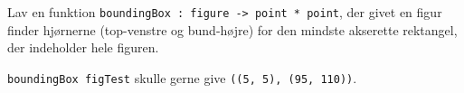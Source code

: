 Lav en funktion \texttt{boundingBox : figure -> point *
    point}, der givet en figur finder hjørnerne (top-venstre og
  bund-højre) for den mindste akserette rektangel, der indeholder hele
  figuren.
  
  \texttt{boundingBox figTest} skulle gerne give \texttt{((5, 5), (95,
    110))}.